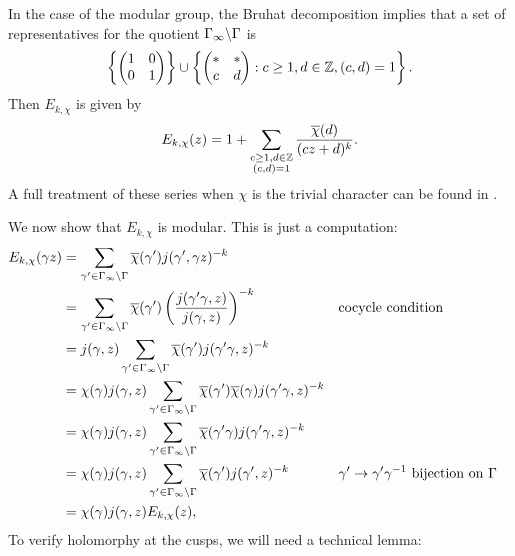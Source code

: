       \begin{remark}\label{rem:Eisenstein_series_on_modular_group}
        In the case of the modular group, the Bruhat decomposition implies that a set of representatives for the quotient $\Gamma_{\infty}\backslash\Gamma$ is
      \[
        \left\{\begin{pmatrix} 1 & 0 \\ 0 & 1 \end{pmatrix}\right\} \cup \left\{\begin{pmatrix} \ast & \ast \\ c & d \end{pmatrix}:c \ge 1, d \in \mathbb{Z}, (c,d) = 1\right\}.
      \]
      Then $E_{k,\chi}$ is given by
        \[
          E_{k,\chi}(z) = 1+\sum_{\substack{c \ge 1, d \in \mathbb{Z} \\ (c,d) = 1}}\frac{\overline{\chi}(d)}{(cz+d)^{k}}.
        \]
        A full treatment of these series when $\chi$ is the trivial character can be found in \cite{conrad2016modular}.
      \end{remark}

      We now show that $E_{k,\chi}$ is modular. This is just a computation:
      \begin{align*}
        E_{k,\chi}(\gamma z) &= \sum_{\gamma' \in \Gamma_{\infty}\backslash\Gamma}\overline{\chi}(\gamma')j(\gamma',\gamma z)^{-k} \\
        &= \sum_{\gamma' \in \Gamma_{\infty}\backslash\Gamma}\overline{\chi}(\gamma')\left(\frac{j(\gamma'\gamma,z)}{j(\gamma,z)}\right)^{-k} && \text{cocycle condition} \\
        &= j(\gamma,z)\sum_{\gamma' \in \Gamma_{\infty}\backslash\Gamma}\overline{\chi}(\gamma')j(\gamma'\gamma,z)^{-k} \\
        &= \chi(\gamma)j(\gamma,z)\sum_{\gamma' \in \Gamma_{\infty}\backslash\Gamma}\overline{\chi}(\gamma')\overline{\chi}(\gamma)j(\gamma'\gamma,z)^{-k} \\
        &= \chi(\gamma)j(\gamma,z)\sum_{\gamma' \in \Gamma_{\infty}\backslash\Gamma}\overline{\chi}(\gamma'\gamma)j(\gamma'\gamma,z)^{-k} \\
        &= \chi(\gamma)j(\gamma,z)\sum_{\gamma' \in \Gamma_{\infty}\backslash\Gamma}\overline{\chi}(\gamma')j(\gamma',z)^{-k} && \text{$\gamma' \to \gamma'\gamma^{-1}$ bijection on $\Gamma$} \\
        &= \chi(\gamma)j(\gamma,z)E_{k,\chi}(z),
      \end{align*}
      To verify holomorphy at the cusps, we will need a technical lemma:

